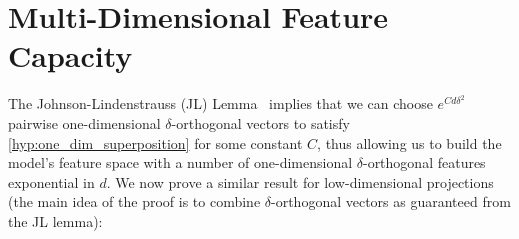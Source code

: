 \documentclass{article} %
\theoremstyle{plain}
\theoremstyle{definition}
\begin{document}



\newpage
\appendix

\section{Multi-Dimensional Feature Capacity}
\label{appendix:bounds}

The Johnson-Lindenstrauss (JL) Lemma~\citep{Johnson1984} implies that we can choose $e^{C d \delta^2}$ pairwise one-dimensional $\delta$-orthogonal vectors to satisfy \cref{hyp:one_dim_superposition} for some constant $C$, thus allowing us to build the model's feature space with a number of one-dimensional $\delta$-orthogonal features exponential in $d$. We now prove a similar result for low-dimensional projections (the main idea of the proof is to combine $\delta$-orthogonal vectors as guaranteed from the JL lemma):
\end{document}
